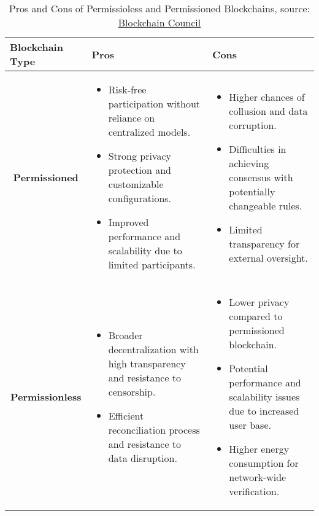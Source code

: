 \begin{table}[h]
\centering
\begin{tabular}{|p{2.5cm}|p{5cm}|p{5cm}|}
\hline
\textbf{Blockchain Type} & \textbf{Pros} & \textbf{Cons} \\
\hline
\multicolumn{1}{|c|}{\textbf{Permissioned}} & 
\begin{itemize}
  \item Risk-free participation without reliance on centralized models.
  \item Strong privacy protection and customizable configurations.
  \item Improved performance and scalability due to limited participants.
\end{itemize} 
& 
\begin{itemize}
  \item Higher chances of collusion and data corruption.
  \item Difficulties in achieving consensus with potentially changeable rules.
  \item Limited transparency for external oversight.
\end{itemize} \\
\hline
\multicolumn{1}{|c|}{\textbf{Permissionless}} & 
\begin{itemize}
  \item Broader decentralization with high transparency and resistance to censorship.
  \item Efficient reconciliation process and resistance to data disruption.
\end{itemize} 
& 
\begin{itemize}
  \item Lower privacy compared to permissioned blockchain.
  \item Potential performance and scalability issues due to increased user base.
  \item Higher energy consumption for network-wide verification.
\end{itemize} \\
\hline
\end{tabular}
\captionsetup{justification=centering}
\caption{Pros and Cons of Permissioless and Permissioned Blockchains, source: \href{https://www.blockchain-council.org/blockchain/permissioned-and-permissionless-blockchains-a-comprehensive-guide/}{Blockchain Council}}\footnotemark[\value{footnote}]
\label{proscons}
\end{table}



